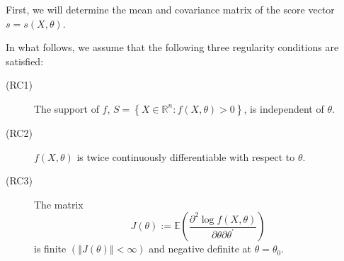 \documentclass[notes=show]{beamer}
\begin{document}
\begin{frame}%


First, we will determine the mean and covariance matrix of the score vector $%
s=s\left( X,\theta \right) $.

In what follows, we assume that the following three regularity conditions
are satisfied:

\begin{description}
\item[(RC1)] The support of $f$, $S=\left \{ X\in \mathbb{R}^{n}:f\left(
X,\theta \right) >0\right \} $, is independent of $\theta $.

\item[(RC2)] $f\left( X,\theta \right) $ is twice continuously
differentiable with respect to $\theta .$

\item[(RC3)] The matrix%
\begin{equation}
J\left( \theta \right) :=\mathbb{E}\left( \frac{\partial ^{2}\log f\left(
X,\theta \right) }{\partial \theta \partial \theta ^{\prime }}\right) 
\label{J}
\end{equation}%
is finite $\left( \left\Vert J\left( \theta \right) \right\Vert <\infty
\right) $ and negative definite at $\theta =\theta _{0}$.
\end{description}

\end{frame}%
\end{document}
